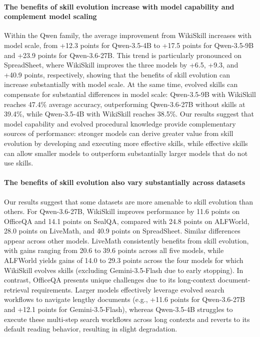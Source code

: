 \documentclass[11pt, a4paper, copyright, gr]{google}
\newcommand{\method}{WikiSkill\xspace}
\begin{document}
\vspace{-5pt}
\paragraph{The benefits of skill evolution increase with model capability and complement model scaling} Within the Qwen family, the average improvement from \method increases with model scale, from +12.3 points for Qwen-3.5-4B to +17.5 points for Qwen-3.5-9B and +23.9 points for Qwen-3.6-27B. This trend is particularly pronounced on SpreadSheet, where \method improves the three models by +6.5, +9.3, and +40.9 points, respectively, showing that the benefits of skill evolution can increase substantially with model scale. At the same time, evolved skills can compensate for substantial differences in model scale: Qwen-3.5-9B with \method reaches 47.4\% average accuracy, outperforming Qwen-3.6-27B without skills at 39.4\%, while Qwen-3.5-4B with \method reaches 38.5\%. Our results suggest that model capability and evolved procedural knowledge provide complementary sources of performance: stronger models can derive greater value from skill evolution by developing and executing more effective skills, while effective skills can allow smaller models to outperform substantially larger models that do not use skills.

\vspace{-5pt}
\paragraph{The benefits of skill evolution also vary substantially across datasets} Our results suggest that some datasets are more amenable to skill evolution than others. For Qwen-3.6-27B, \method improves performance by 11.6 points on OfficeQA and 14.1 points on SealQA, compared with 24.8 points on ALFWorld, 28.0 points on LiveMath, and 40.9 points on SpreadSheet. Similar differences appear across other models. LiveMath consistently benefits from skill evolution, with gains ranging from 20.6 to 39.6 points across all five models, while ALFWorld yields gains of 14.0 to 29.3 points across the four models for which WikiSkill evolves skills (excluding Gemini-3.5-Flash due to early stopping). In contrast, OfficeQA presents unique challenges due to its long-context document-retrieval requirements. Larger models effectively leverage evolved search workflows to navigate lengthy documents (e.g., +11.6 points for Qwen-3.6-27B and +12.1 points for Gemini-3.5-Flash), whereas Qwen-3.5-4B struggles to execute these multi-step search workflows across long contexts and reverts to its default reading behavior, resulting in slight degradation.
\end{document}
